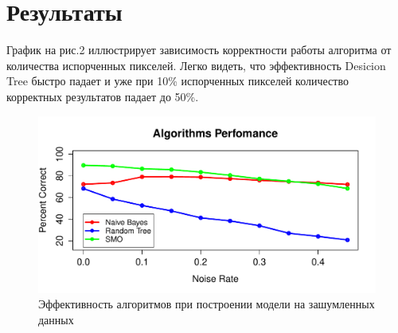 \documentclass{article}
\begin{document}
\section{Результаты}
График на рис.2 иллюстрирует зависимость корректности работы алгоритма от количества испорченных пикселей. Легко видеть, что эффективность Desicion Tree быстро падает и уже при 10\% испорченных пикселей количество корректных результатов падает до 50\%.
\begin{figure}[h]
\includegraphics[width=\textwidth]{graphics/perfomance1.pdf}
\captionsetup{justification=centering}
\caption{Эффективность алгоритмов при построении модели на зашумленных данных}
\end{figure}
\end{document}
